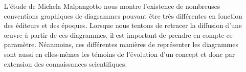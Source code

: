 L'étude de Michela Malpangotto nous montre l'existence de nombreuses conventions graphiques de diagrammes pouvant être très différentes en fonction des éditeurs et des époques.
Lorsque nous tentons de retracer la diffusion d'une œuvre à partir de ces diagrammes, il est important de prendre en compte ce paramètre.
Néanmoins, ces différentes manières de représenter les diagrammes sont aussi en elles-mêmes les témoins de l'évolution d'un concept et donc par extension des connaissances scientifiques.